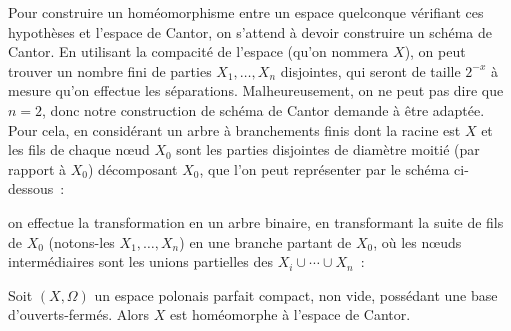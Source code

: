 Pour construire un homéomorphisme entre un espace quelconque vérifiant ces
hypothèses et l'espace de Cantor, on s'attend à devoir construire un schéma de
Cantor. En utilisant la compacité de l'espace (qu'on nommera $X$), on peut
trouver un nombre fini de parties $X_1,\ldots,X_n$ disjointes, qui seront
de taille $2^{-x}$ à mesure qu'on effectue les séparations. Malheureusement,
on ne peut pas dire que $n = 2$, donc notre construction de schéma de Cantor
demande à être adaptée. Pour cela, en considérant un arbre à branchements
finis dont la racine est $X$ et les fils de chaque n\oe ud $X_0$ sont les
parties disjointes de diamètre moitié (par rapport à $X_0$) décomposant $X_0$,
que l'on peut représenter par le schéma ci-dessous~:
\begin{center}
\end{center}
on effectue la transformation en un arbre binaire, en transformant
la suite de fils de $X_0$ (notons-les $X_1,\ldots,X_n$) en une branche partant
de $X_0$, où les n\oe uds intermédiaires sont les unions partielles des
$X_i\cup\cdots \cup X_n$~:
\begin{center}
\end{center}

\begin{theorem}
  Soit $(X,\Omega)$ un espace polonais parfait compact, non vide, possédant une
  base d'ouverts-fermés. Alors $X$ est homéomorphe à l'espace de Cantor.
\end{theorem}

